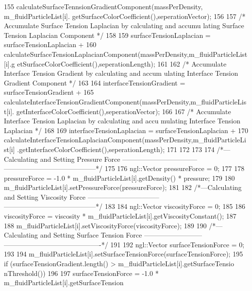 \begin{DoxyCode}
{{{{155                                          
      calculateSurfaceTennsionGradientComponent(massPerDensity, m_fluidParticleList[i].
      getSurfaceColorCoefficient(),seperationVector);
156 
157                 /* Accumulate Surface Tension Laplacian by calculating and accumu
      lating Surface Tension Laplacian Component */
158 
159                 surfaceTensionLaplacian = surfaceTensionLaplacian +
160                                           
      calculateSurfaceTensionLaplacianComponent(massPerDensity,m_fluidParticleList[i].g
      etSurfaceColorCoefficient(),seperationLength);
161 
162                 /* Accumulate Interface Tension Gradient by calculating and accum
      ulating Interface Tension Gradient Component */
163 
164                 interfaceTensionGradient = surfaceTensionGradient +
165                                            
      calculateInterfaceTensionGradientComponent(massPerDensity,m_fluidParticleList[i].
      getInterfaceColorCoefficient(),seperationVector);
166 
167                 /* Accumulate Interface Tension Laplacian by calculating and accu
      mulating Interface Tension Laplacian */
168 
169                 interfaceTensionLaplacian = surfaceTensionLaplacian +
170                                             
      calculateInterfaceTensionLaplacianComponent(massPerDensity,m_fluidParticleList[i]
      .getInterfaceColorCoefficient(),seperationLength);
171 
172             }
173 
174     /*---Calculating and Setting Pressure Force ---------------------------------
      -----------------------------------------*/
175 
176     ngl::Vector pressureForce = 0;
177 
178     pressureForce = -1.0 * m_fluidParticleList[i].getDensity() * pressure;
179 
180     m_fluidParticleList[i].setPressureForce(pressureForce);
181 
182     /*---Calculating and Setting Viscosity Force --------------------------------
      -----------------------------------------*/
183 
184     ngl::Vector viscosityForce = 0;
185 
186     viscosityForce = viscosity * m_fluidParticleList[i].getViscosityConstant();
187 
188     m_fluidParticleList[i].setViscosityForce(viscosityForce);
189 
190     /*---Calculating and Setting Surface Tension Force --------------------------
      -------------------------------------------*/
191 
192     ngl::Vector surfaceTensionForce = 0;
193 
194     m_fluidParticleList[i].setSurfaceTensionForce(surfaceTensionForce);
195     if (surfaceTensionGradient.length() > m_fluidParticleList[i].getSurfaceTensio
      nThreshold())
196         {
197             surfaceTensionForce = -1.0 * m_fluidParticleList[i].getSurfaceTension
}}}}
\end{DoxyCode}
